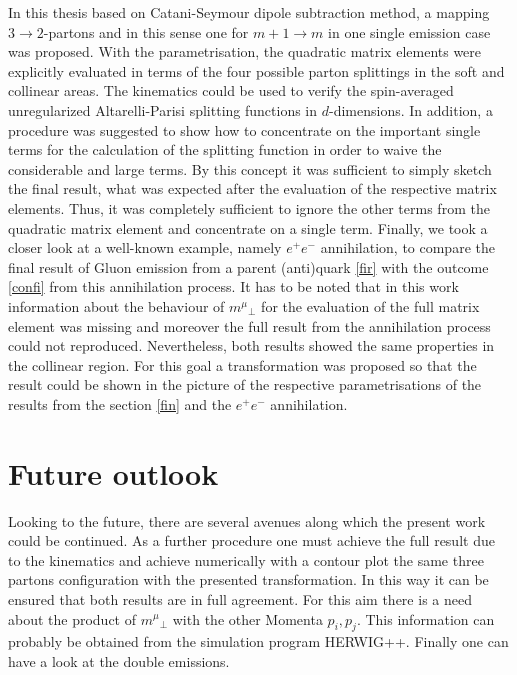 In this thesis based on Catani-Seymour dipole subtraction method, a mapping $3\rightarrow 2 $-partons and in this sense one for $m+1\rightarrow m $ in one single emission case was proposed. With the parametrisation, the quadratic matrix elements were explicitly evaluated in terms of the four possible parton splittings in the soft and collinear areas. The kinematics could be used to verify the spin-averaged  unregularized  Altarelli-Parisi  splitting  functions  in $ d $-dimensions. In addition, a procedure was suggested to show how to concentrate on the important single terms for the calculation of the splitting function in order to waive the considerable and large terms. By this concept it was sufficient to simply sketch the final result, what was expected after the evaluation of the respective matrix elements. Thus, it was completely sufficient to ignore the other terms from the quadratic matrix element and concentrate on a single term. Finally, we took a closer look at a well-known example, namely $ e^{+}e^{-} $ annihilation, to compare the final result of Gluon emission from a parent (anti)quark \ref{fir} with the outcome \ref{confi} from this annihilation process. It has to be noted that in this work information about the behaviour of ${m^{\mu}}_{\bot}$ for the evaluation of the full matrix element was missing and moreover the full result from the annihilation process could not reproduced. Nevertheless, both results showed the same properties in the collinear region. For this goal a transformation was proposed so that the result could be shown in the picture of the respective parametrisations of the results from the section \ref{fin} and the $ e^{+}e^{-}$ annihilation. 

\section*{Future outlook}
Looking to the future, there are several avenues along which the present work could be continued. As a further procedure one must achieve the full result due to the kinematics and achieve numerically with a contour plot the same three partons configuration with the presented transformation. In this way it can be ensured that both results are in full agreement. For this aim there is a need about the product of ${m^{\mu}}_{\bot}$ with the other Momenta $ p_i, p_j $. This information can probably be obtained from the simulation program HERWIG++. Finally one can have a look at the double emissions.